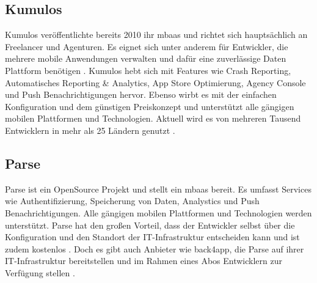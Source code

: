 \subsection{Kumulos}
Kumulos veröffentlichte bereits 2010 ihr \gls{mbaas} und richtet sich hauptsächlich an Freelancer und Agenturen. Es eignet sich unter anderem für Entwickler, die mehrere mobile Anwendungen verwalten und dafür eine zuverlässige Daten Plattform benötigen \cite{canival}. Kumulos hebt sich mit Features wie Crash Reporting, Automatisches Reporting \& Analytics, App Store Optimierung, Agency Console und Push Benachrichtigungen hervor. Ebenso wirbt es mit der einfachen Konfiguration und dem günstigen Preiskonzept und unterstützt alle gängigen mobilen Plattformen und Technologien. Aktuell wird es von mehreren Tausend Entwicklern in mehr als 25 Ländern genutzt \cite{kumulos}.

\subsection{Parse}
Parse ist ein OpenSource Projekt und stellt ein \gls{mbaas} bereit. Es umfasst Services wie Authentifizierung, Speicherung von Daten, Analystics und Push Benachrichtigungen. Alle gängigen mobilen Plattformen und Technologien werden unterstützt. Parse hat den großen Vorteil, dass der Entwickler selbst über die Konfiguration und den Standort der IT-Infrastruktur entscheiden kann und ist zudem kostenlos \cite{parse}. Doch es gibt auch Anbieter wie back4app, die Parse auf ihrer IT-Infrastruktur bereitstellen und im Rahmen eines Abos Entwicklern zur Verfügung stellen \cite{back4app}. 
